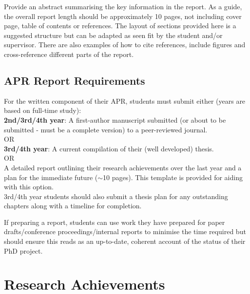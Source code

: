 \documentclass[11pt]{report}
\begin{document}
Provide an abstract summarising the key information in the report.  As a guide, the overall report length should be approximately 10 pages, not including cover page, table of contents or references.  The layout of sections provided here is a suggested structure but can be adapted as seen fit by the student and/or supervisor.  There are also examples of how to cite references, include figures and cross-reference different parts of the report.

\section*{APR Report Requirements}

For the written component of their APR, students must submit either (years are based on full-time study): \\

\textbf{2nd/3rd/4th year}: A first-author manuscript submitted (or about to be submitted - must be a complete version) to a peer-reviewed journal. \\

OR \\

\textbf{3rd/4th year}: A current compilation of their (well developed) thesis. \\

OR \\

A detailed report outlining their research achievements over the last year and a plan for the immediate future ($\sim$10 pages). This template is provided for aiding with this option.\\

3rd/4th year students should also submit a thesis plan for any outstanding chapters along with a timeline for completion.

If preparing a report, students can use work they have prepared for paper drafts/conference proceedings/internal reports to minimise the time required but should ensure this reads as an up-to-date, coherent account of the status of their PhD project.

\chapter{Research Achievements}
\end{document}
